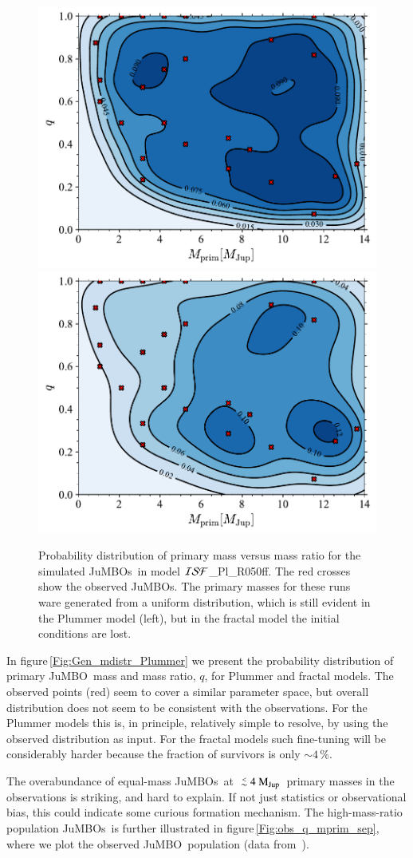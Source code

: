\documentclass[submission,phys]{lib/SciPost}
\newcommand{\MJup}{\mbox{$\mathrm{{M}}_{\rm Jup}$}}
\def\aplt{\ {\raise-.5ex\hbox{$\buildrel<\over\sim$}}\ }
\newcommand{\jumbo}{\mbox{JuMBO}}
\newcommand{\jumbos}{\mbox{JuMBOs}}
\begin{document}
\begin{figure}
    \centering
    \includegraphics[width=0.49\columnwidth]{figures/Plummer_rvir0.5_FF_mass_distr.pdf}
    \includegraphics[width=0.49\columnwidth]{figures/Fractal_rvir0.5_FF_mass_distr.pdf}
    \caption{Probability distribution of primary mass versus mass
      ratio for the simulated \jumbos\, in model ${\cal
        ISF}$\_Pl\_R050ff.  The red crosses show the
      observed \jumbos.  The primary masses for these runs ware
      generated from a uniform distribution, which is still evident in
      the Plummer model (left), but in the fractal model the initial
      conditions are lost.  }
         \label{Fig:Gen_mdistr_Plummer}
         \label{Fig:Gen_mdistr_Fractal}
\end{figure}

In figure\,\ref{Fig:Gen_mdistr_Plummer} we present the probability
distribution of primary \jumbo\, mass and mass ratio, $q$, for Plummer
and fractal models.  The observed points (red) seem to cover a similar
parameter space, but overall distribution does not seem to be
consistent with the observations. For the Plummer models this is, in
principle, relatively simple to resolve, by using the observed
distribution as input. For the fractal models such fine-tuning will be
considerably harder because the fraction of survivors is only $\sim
4$\,\%.

The overabundance of equal-mass \jumbos\, at $\aplt 4$\,\MJup\,
primary masses in the observations is striking, and hard to
explain. If not just statistics or observational bias, this could
indicate some curious formation mechanism. The high-mass-ratio
population \jumbos\, is further illustrated in
figure\,\ref{Fig:obs_q_mprim_sep}, where we plot the observed \jumbo\,
population (data from \,\cite{2023arXiv231001231P}).
\end{document}
